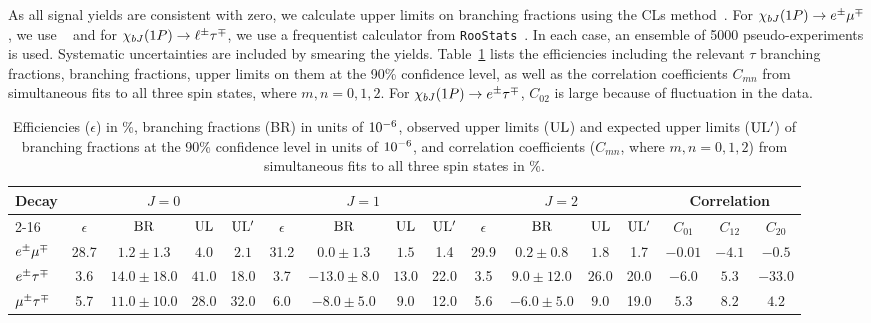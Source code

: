 \documentclass[aps,prl,twocolumn,superscriptaddress,showpacs,preprintnumbers,amsmath,amssymb, nofootinbib]{revtex4-2}
\begin{document}
As all signal yields are consistent with zero, we calculate upper limits on branching fractions using the CLs method~\cite{CLs:2011}.
For $\chi_{bJ}(1P)\rightarrow e^\pm \mu^\mp$, we use \pyhf~\cite{Heinrich:2021gyp} and for $\chi_{bJ}(1P)\rightarrow\ell^\pm\tau^\mp$, we use a frequentist calculator from {\tt RooStats}~\cite{Moneta:2010pm}.
In each case, an ensemble of 5000 pseudo-experiments is used.
Systematic uncertainties are included by smearing the yields.
Table~\ref{tab:lfv} lists the efficiencies including the relevant $\tau$ branching fractions, branching fractions, upper limits on them at the 90\% confidence level, as well as the correlation coefficients $C_{mn}$ from simultaneous fits to all three spin states, where $m, n = 0, 1, 2$. For $\chi_{bJ}(1P)\rightarrow e^\pm\tau^\mp$, $C_{02}$ is large because of fluctuation in the data.


\begin{table}[htbp]
  \centering
  \begin{tabular}{l|c|c|c|c|c|c|c|c|c|c|c|c|c|c|c}
  \hline\hline
  \multirow{2}{*}{Decay} &\multicolumn{4}{c|}{$J=0$} &\multicolumn{4}{c|}{$J=1$} &\multicolumn{4}{c|}{$J=2$} & \multicolumn{3}{c}{Correlation}\\
  \cline{2-16}
  &$\epsilon$ &${\rm BR}$ &${\rm UL}$ &${\rm UL^\prime}$ &$\epsilon$ &${\rm BR}$ &${\rm UL}$ &${\rm UL^\prime}$  &$\epsilon$ &${\rm BR}$ &${\rm UL}$ &${\rm UL^\prime}$ &$C_{01}$ &$C_{12}$ &$C_{20}$\\
  \hline
  $e^\pm \mu^\mp$ &28.7 &$1.2\pm1.3$ &$4.0$ &$2.1$  &31.2 &$0.0\pm1.3$ &$1.5$ &1.4  &29.9 & $0.2\pm0.8$  &$1.8$ &1.7  & $-0.01$ & $-4.1$ & $-0.5$\\

  $e^\pm \tau^\mp$ &3.6 &$14.0\pm18.0$ &$41.0$ &18.0 &3.7 &$-13.0\pm8.0$ &$13.0$ &22.0 &3.5 & $9.0\pm12.0$ &$26.0$ &20.0 & $-6.0$  & $5.3$  & $-33.0$\\

  $\mu^\pm \tau^\mp$ &5.7 &$11.0\pm10.0$ &$28.0$ &32.0 &6.0 &$-8.0\pm5.0$  &$9.0$ &12.0 &5.6 &$-6.0\pm5.0$ &$9.0$ &19.0  &$5.3$  &$8.2$  &$4.2$\\
  \hline\hline
  \end{tabular}
  \caption{Efficiencies ($\epsilon$) in \%, branching fractions (BR) in units of $10^{-6}$, observed  upper limits ($\rm UL$) and expected upper limits ($\rm UL^\prime$) of branching fractions at the 90\% confidence level in units of $10^{-6}$, and correlation coefficients ($C_{mn}$, where $m, n = 0, 1, 2$) from simultaneous fits to all three spin states in \%.}
\label{tab:lfv}
\end{table}
\end{document}
